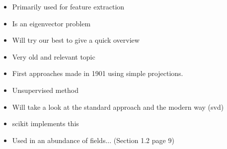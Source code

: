 \begin{itemize}
	\item Primarily used for feature extraction \cite{PythonMachineLearningCh5}
	\item Is an eigenvector problem \cite{MultilinearSubspaceLearningCh2}
	\item Will try our best to give a quick overview
	\item Very old and relevant topic
	\item First approaches made in 1901 using simple projections. \cite{pearson1901liii}
	\item Unsupervised method \cite{PythonMachineLearningCh5}
	\item Will take a look at the standard approach and the modern way (svd)
	\item scikit implements this \cite{tipping1999mixtures}
	\item Used in an abundance of fields... \cite{Jolliffe2002book} (Section 1.2 page 9)
\end{itemize}









